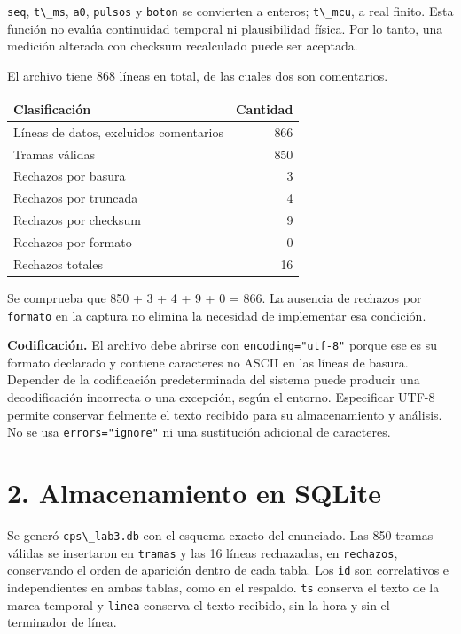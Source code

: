 \documentclass[
  11pt,
]{article}
\newcommand{\passthrough}[1]{#1}
\begin{document}
\passthrough{\lstinline!seq!}, \passthrough{\lstinline!t\_ms!},
\passthrough{\lstinline!a0!}, \passthrough{\lstinline!pulsos!} y
\passthrough{\lstinline!boton!} se convierten a enteros;
\passthrough{\lstinline!t\_mcu!}, a real finito. Esta función no evalúa
continuidad temporal ni plausibilidad física. Por lo tanto, una medición
alterada con checksum recalculado puede ser aceptada.

El archivo tiene 868 líneas en total, de las cuales dos son comentarios.

\Needspace{4.5cm}
\begin{longtable}[]{@{}lr@{}}
\toprule\noalign{}
Clasificación & Cantidad \\
\midrule\noalign{}
\endhead
\bottomrule\noalign{}
\endlastfoot
Líneas de datos, excluidos comentarios & 866 \\
Tramas válidas & 850 \\
Rechazos por basura & 3 \\
Rechazos por truncada & 4 \\
Rechazos por checksum & 9 \\
Rechazos por formato & 0 \\
Rechazos totales & 16 \\
\end{longtable}

Se comprueba que 850 + 3 + 4 + 9 + 0 = 866. La ausencia de rechazos por
\passthrough{\lstinline!formato!} en la captura no elimina la necesidad
de implementar esa condición.

\textbf{Codificación.} El archivo debe abrirse con
\passthrough{\lstinline!encoding="utf-8"!} porque ese es su formato
declarado y contiene caracteres no ASCII en las líneas de basura.
Depender de la codificación predeterminada del sistema puede producir
una decodificación incorrecta o una excepción, según el entorno.
Especificar UTF-8 permite conservar fielmente el texto recibido para su
almacenamiento y análisis. No se usa
\passthrough{\lstinline!errors="ignore"!} ni una sustitución adicional
de caracteres.

\hypertarget{almacenamiento-en-sqlite}{%
\section{2. Almacenamiento en SQLite}\label{almacenamiento-en-sqlite}}

Se generó \passthrough{\lstinline!cps\_lab3.db!} con el esquema exacto
del enunciado. Las 850 tramas válidas se insertaron en
\passthrough{\lstinline!tramas!} y las 16 líneas rechazadas, en
\passthrough{\lstinline!rechazos!}, conservando el orden de aparición
dentro de cada tabla. Los \passthrough{\lstinline!id!} son correlativos
e independientes en ambas tablas, como en el respaldo.
\passthrough{\lstinline!ts!} conserva el texto de la marca temporal y
\passthrough{\lstinline!linea!} conserva el texto recibido, sin la hora
y sin el terminador de línea.
\end{document}

